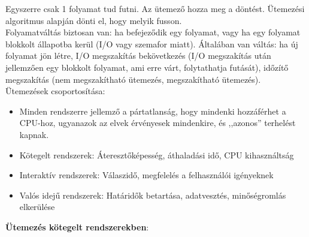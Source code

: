\documentclass[margin=0px]{article}
\begin{document}
	Egyszerre csak 1 folyamat tud futni. Az ütemező hozza meg a döntést. Ütemezési algoritmus alapján dönti el, hogy melyik fusson. \\
	Folyamatváltás biztosan van: ha befejeződik egy folyamat, vagy ha egy folyamat blokkolt állapotba kerül (I/O vagy szemafor miatt). Általában van váltás: ha új folyamat jön létre, I/O megszakítás bekövetkezés (I/O megszakítás után jellemzően egy blokkolt folyamat, ami erre várt, folytathatja futását), időzítő megszakítás (nem megszakítható ütemezés, megszakítható ütemezés). \\
	Ütemezések csoportosítása:
	\begin{itemize}
		\item Minden rendszerre jellemző a pártatlanság, hogy mindenki hozzáférhet a CPU-hoz, ugyanazok az elvek érvényesek mindenkire, és ,,azonos” terhelést kapnak.
		\item Kötegelt rendszerek: Áteresztőképesség, áthaladási idő, CPU kihasználtság
		\item Interaktív rendszerek: Válaszidő, megfelelés a felhasználói igényeknek
		\item Valós idejű rendszerek: Határidők betartása, adatvesztés, minőségromlás
		elkerülése
	\end{itemize}
	\textbf{Ütemezés kötegelt rendszerekben}:
\end{document}
